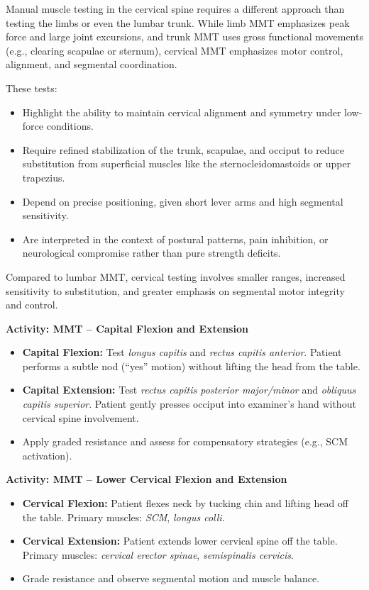 Manual muscle testing in the cervical spine requires a different approach than testing the limbs or even the lumbar trunk. While limb MMT emphasizes peak force and large joint excursions, and trunk MMT uses gross functional movements (e.g., clearing scapulae or sternum), cervical MMT emphasizes motor control, alignment, and segmental coordination.

These tests:

\begin{itemize}
  \item Highlight the ability to maintain cervical alignment and symmetry under low-force conditions.
  \item Require refined stabilization of the trunk, scapulae, and occiput to reduce substitution from superficial muscles like the sternocleidomastoids or upper trapezius.
  \item Depend on precise positioning, given short lever arms and high segmental sensitivity.
  \item Are interpreted in the context of postural patterns, pain inhibition, or neurological compromise rather than pure strength deficits.
\end{itemize}

Compared to lumbar MMT, cervical testing involves smaller ranges, increased sensitivity to substitution, and greater emphasis on segmental motor integrity and control.

\begin{labactivitybox}
\textbf{Activity: MMT – Capital Flexion and Extension}

\begin{itemize}
  \item \textbf{Capital Flexion:} Test \textit{longus capitis} and \textit{rectus capitis anterior}. Patient performs a subtle nod (“yes” motion) without lifting the head from the table.
  \item \textbf{Capital Extension:} Test \textit{rectus capitis posterior major/minor} and \textit{obliquus capitis superior}. Patient gently presses occiput into examiner’s hand without cervical spine involvement.
  \item Apply graded resistance and assess for compensatory strategies (e.g., SCM activation).
\end{itemize}
\end{labactivitybox}

\begin{labactivitybox}
\textbf{Activity: MMT – Lower Cervical Flexion and Extension}

\begin{itemize}
  \item \textbf{Cervical Flexion:} Patient flexes neck by tucking chin and lifting head off the table. Primary muscles: \textit{SCM}, \textit{longus colli}.
  \item \textbf{Cervical Extension:} Patient extends lower cervical spine off the table. Primary muscles: \textit{cervical erector spinae}, \textit{semispinalis cervicis}.
  \item Grade resistance and observe segmental motion and muscle balance.
\end{itemize}
\end{labactivitybox}


